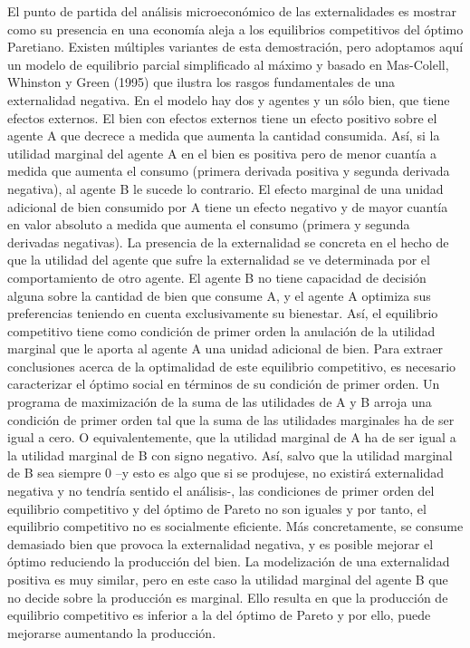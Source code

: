 \documentclass{nuevotema}
\begin{document}
El punto de partida del análisis microeconómico de las externalidades es mostrar como su presencia en una economía aleja a los equilibrios competitivos del óptimo Paretiano. Existen múltiples variantes de esta demostración, pero adoptamos aquí un modelo de equilibrio parcial simplificado al máximo y basado en Mas-Colell, Whinston y Green (1995) que ilustra los rasgos fundamentales de una externalidad negativa. En el modelo hay dos y agentes y un sólo bien, que tiene efectos externos. El bien con efectos externos tiene un efecto positivo sobre el agente A que decrece a medida que aumenta la cantidad consumida. Así, si la utilidad marginal del agente A en el bien es positiva pero de menor cuantía a medida que aumenta el consumo (primera derivada positiva y segunda derivada negativa), al agente B le sucede lo contrario. El efecto marginal de una unidad adicional de bien consumido por A tiene un efecto negativo y de mayor cuantía en valor absoluto a medida que aumenta el consumo (primera y segunda derivadas negativas). La presencia de la externalidad se concreta en el hecho de que la utilidad del agente que sufre la externalidad se ve determinada por el comportamiento de otro agente. El agente B no tiene capacidad de decisión alguna sobre la cantidad de bien que consume A, y el agente A optimiza sus preferencias teniendo en cuenta exclusivamente su bienestar. Así, el equilibrio competitivo tiene como condición de primer orden la anulación de la utilidad marginal que le aporta al agente A una unidad adicional de bien. Para extraer conclusiones acerca de la optimalidad de este equilibrio competitivo, es necesario caracterizar el óptimo social en términos de su condición de primer orden. Un programa de maximización de la suma de las utilidades de A y B arroja una condición de primer orden tal que la suma de las utilidades marginales ha de ser igual a cero. O equivalentemente, que la utilidad marginal de A ha de ser igual a la utilidad marginal de B con signo negativo. Así, salvo que la utilidad marginal de B sea siempre 0 --y esto es algo que si se produjese, no existirá externalidad negativa y no tendría sentido el análisis-, las condiciones de primer orden del equilibrio competitivo y del óptimo de Pareto no son iguales y por tanto, el equilibrio competitivo no es socialmente eficiente. Más concretamente, se consume demasiado bien que provoca la externalidad negativa, y es posible mejorar el óptimo reduciendo la producción del bien. La modelización de una externalidad positiva es muy similar, pero en este caso la utilidad marginal del agente B que no decide sobre la producción es marginal. Ello resulta en que la producción de equilibrio competitivo es inferior a la del óptimo de Pareto y por ello, puede mejorarse aumentando la producción.
\end{document}
